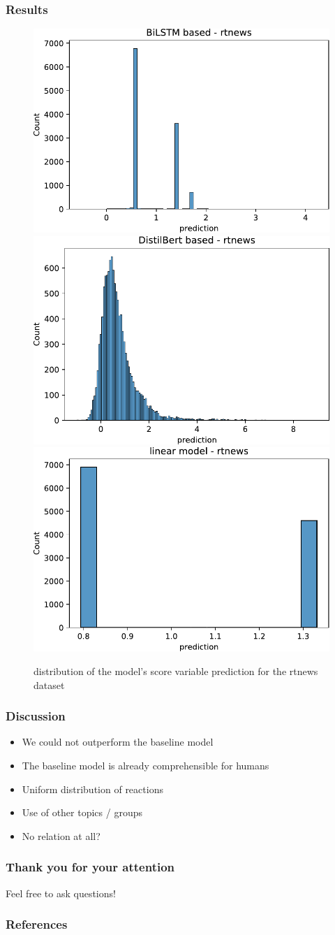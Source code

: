\documentclass[notes]{tum-presentation}
\begin{document}
\begin{frame}
  \frametitle{Results}
  \begin{figure}[tb]
      \centering
      \includegraphics[width=.33\textwidth]{../report/figures/prediction_rtnews/bilstm_dist.pdf}
      \includegraphics[width=.32\textwidth]{../report/figures/prediction_rtnews/distil_bert_dist.pdf}
      \includegraphics[width=.33\textwidth]{../report/figures/prediction_rtnews/linear_model_prediction_dist.pdf}
      \caption{distribution of the model's score variable prediction for the rtnews dataset}
      \label{fig:dist-prediction-rtnews}
  \end{figure}
\end{frame}

\begin{frame}
  \frametitle{Discussion}
  \begin{itemize}
    \item We could not outperform the baseline model
    \item The baseline model is already comprehensible for humans
  \end{itemize}
  \vspace*{2cm}
  \begin{itemize}
    \item Uniform distribution of reactions
    \item Use of other topics / groups
    \item No relation at all?
  \end{itemize}
\end{frame}


\begin{frame}
  \frametitle{Thank you for your attention}

  Feel free to ask questions!
\end{frame}

\begin{frame}[allowframebreaks]
  \frametitle{References}
  \nocite{*}
  
\end{frame}


\end{document}

